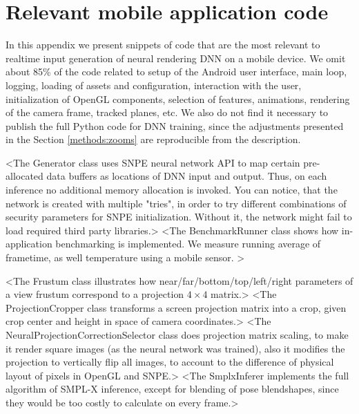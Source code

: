 \chapter{Relevant mobile application code}
\label{appendix-code}

In this appendix we present snippets of code that are the most relevant to realtime input generation of neural rendering DNN on a mobile device. We omit about 85\% of the code related to setup of the Android user interface, main loop, logging, loading of assets and configuration, interaction with the user, initialization of OpenGL components, selection of features, animations, rendering of the camera frame, tracked planes, etc. We also do not find it necessary to publish the full Python code for DNN training, since the adjustments presented in the Section \ref{methods:zooms} are reproducible from the description.

<The Generator class uses SNPE neural network API to map certain pre-allocated data buffers as locations of DNN input and output. Thus, on each inference no additional memory allocation is invoked. You can notice, that the network is created with multiple "tries", in order to try different combinations of security parameters for SNPE initialization. Without it, the network might fail to load required third party libraries.>
<The BenchmarkRunner class shows how in-application benchmarking is implemented. We measure running average of frametime, as well temperature using a mobile sensor. >


<The Frustum class illustrates how near/far/bottom/top/left/right parameters of a view frustum correspond to a projection $4\times4$ matrix.>
<The ProjectionCropper class transforms a screen projection matrix into a crop, given crop center and height in space of camera coordinates.>
<The NeuralProjectionCorrectionSelector class does projection matrix scaling, to make it render square images (as the neural network was trained), also it modifies the projection to vertically flip all images, to account to the difference of physical layout of pixels in OpenGL and SNPE.>
<The SmplxInferer implements the full algorithm of SMPL-X inference, except for blending of pose blendshapes, since they would be too costly to calculate on every frame.>

